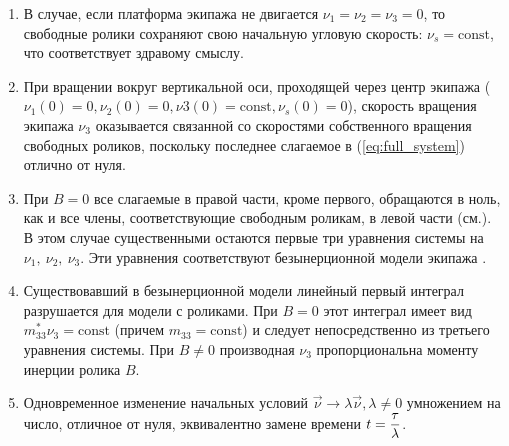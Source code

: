 \begin{enumerate}
    \item В случае, если платформа экипажа не двигается $\nu_1 = \nu_2 = \nu_3 = 0$, то свободные ролики сохраняют свою начальную угловую скорость: $\nu_s = \mathrm{const}$, что соответствует здравому смыслу. 
    \item При вращении вокруг вертикальной оси, проходящей через центр экипажа ($\nu_1(0) = 0, \nu_2(0) = 0, \nu3(0) = \mathrm{const}, \nu_s(0) = 0$), скорость вращения экипажа $\nu_3$ оказывается связанной со скоростями собственного вращения свободных роликов, поскольку последнее слагаемое в (\ref{eq:full_system}) отлично от нуля.
    \item При $B = 0$ все слагаемые в правой части, кроме первого, обращаются в ноль, как и все члены, соответствующие свободным роликам, в левой части (см.). В этом случае существенными остаются первые три уравнения системы на $\nu_1,\ \nu_2,\ \nu_3$. Эти уравнения соответствуют безынерционной модели экипажа \cite{ZobovaTatarinov}.
    \item Существовавший в безынерционной модели линейный первый интеграл разрушается для модели с роликами. При $B = 0$ этот интеграл имеет вид
    $m_{33}^*\nu_3 = \mathrm{const}$ (причем $m_{33} = \mathrm{const}$) и следует непосредственно из третьего уравнения системы. При $B\neq 0$ производная $\nu_3$ пропорциональна моменту инерции ролика $B$.
    \item Одновременное изменение начальных условий $\vec{\nu} \rightarrow \lambda\vec{\nu}, \lambda \neq 0$ умножением на число, отличное от нуля, эквивалентно замене времени $t = \displaystyle\frac{\displaystyle \tau}{\displaystyle \lambda}$.
\end{enumerate}

